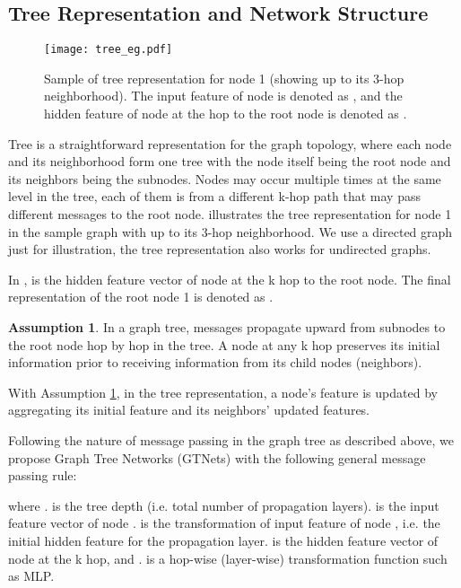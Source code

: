 \documentclass[lettersize,journal]{IEEEtran}
\theoremstyle{plain}
\theoremstyle{definition}
\newtheorem{assumption}[theorem]{Assumption}
\theoremstyle{remark}
\begin{document}
\subsection{Tree Representation and Network Structure} 
\label{GTNet}

\begin{figure}[ht]
	\begin{center}
		\texttt{[image: tree\_eg.pdf]}
		\caption{Sample of tree representation for node 1 (showing up to its 3-hop neighborhood). The input feature of node  is denoted as , and the hidden feature of node  at the  hop to the root node is denoted as .}
		\label{fig:tree}
	\end{center}
\end{figure}

Tree is a straightforward representation for the graph topology, where each node and its neighborhood form one tree with the node itself being the root node and its neighbors being the subnodes. Nodes may occur multiple times at the same level in the tree, each of them is from a different k-hop path that may pass different messages to the root node.  illustrates the tree representation for node 1 in the sample graph with up to its 3-hop neighborhood. We use a directed graph just for illustration, the tree representation also works for undirected graphs.

In ,  is the hidden feature vector of node  at the k hop to the root node. The final representation of the root node 1 is denoted as .

\begin{assumption}
	\label{assumption}
	In a graph tree, messages propagate upward from subnodes to the root node hop by hop in the tree. A node  at any k hop preserves its initial information prior to receiving information from its child nodes (neighbors).
\end{assumption}
With Assumption \ref{assumption}, in the tree representation, a node's feature is updated by aggregating its initial feature and its neighbors' updated features.

Following the nature of message passing in the graph tree as described above, we propose Graph Tree Networks (GTNets) with the following general message passing rule:

where .  is the tree depth (i.e. total number of propagation layers).  is the input feature vector of node .  is the transformation of input feature of node , i.e. the initial hidden feature for the propagation layer.  is the hidden feature vector of node  at the k hop, and .  is a hop-wise (layer-wise) transformation function such as MLP.
\end{document}
